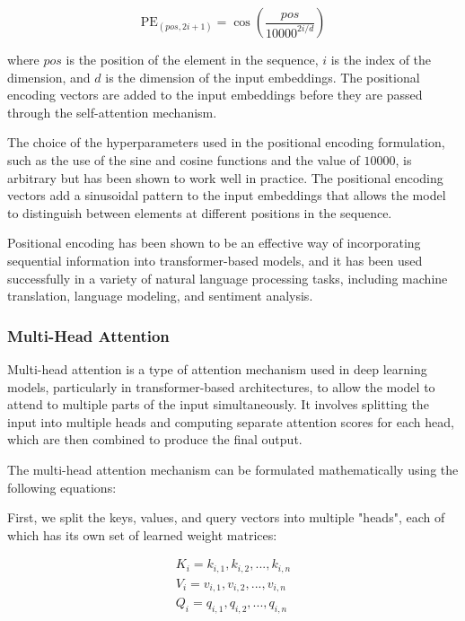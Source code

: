 \begin{equation}
	\text{PE}_{(pos,2i+1)} = \cos\left(\frac{pos}{10000^{2i/d}}\right)
\end{equation}

where $pos$ is the position of the element in the sequence, $i$ is the index of the dimension, and $d$ is the dimension of the input embeddings. The positional encoding vectors are added to the input embeddings before they are passed through the self-attention mechanism.

The choice of the hyperparameters used in the positional encoding formulation, such as the use of the sine and cosine functions and the value of $10000$, is arbitrary but has been shown to work well in practice. The positional encoding vectors add a sinusoidal pattern to the input embeddings that allows the model to distinguish between elements at different positions in the sequence.

Positional encoding has been shown to be an effective way of incorporating sequential information into transformer-based models, and it has been used successfully in a variety of natural language processing tasks, including machine translation, language modeling, and sentiment analysis.

\subsubsection{Multi-Head Attention}
\label{subsubsec:3_multi_head_attention}

Multi-head attention is a type of attention mechanism used in deep learning models, particularly in transformer-based architectures, to allow the model to attend to multiple parts of the input simultaneously. It involves splitting the input into multiple heads and computing separate attention scores for each head, which are then combined to produce the final output.

The multi-head attention mechanism can be formulated mathematically using the following equations:

First, we split the keys, values, and query vectors into multiple "heads", each of which has its own set of learned weight matrices:

\begin{equation}
\begin{split}
	K_i = {k_{i,1}, k_{i,2}, ..., k_{i,n}} \\
	V_i = {v_{i,1}, v_{i,2}, ..., v_{i,n}} \\
	Q_i = {q_{i,1}, q_{i,2}, ..., q_{i,n}}
\end{split}
\end{equation}

